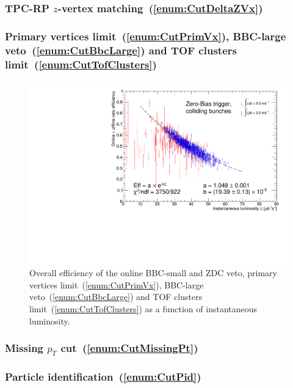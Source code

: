 \subsubsection{TPC-RP \texorpdfstring{$z$}{z}-vertex matching~(\ref{enum:CutDeltaZVx})}
\subsubsection{Primary vertices limit~(\ref{enum:CutPrimVx}), BBC-large veto~(\ref{enum:CutBbcLarge}) and TOF clusters limit~(\ref{enum:CutTofClusters})}
\begin{figure}[ht!]
\centering%
\includegraphics[width=0.65\linewidth,page=1]{graphics/corrections/OnlineAndOfflineVetoEffVsInstLumi_graph.pdf}%
\caption{Overall efficiency of the online BBC-small and ZDC veto, primary vertices limit~(\ref{enum:CutPrimVx}), BBC-large veto~(\ref{enum:CutBbcLarge}) and TOF clusters limit~(\ref{enum:CutTofClusters}) as a function of instantaneous luminosity.}\label{fig:onlineAndOfflineVetoEff}%
\end{figure}
\subsubsection{Missing \texorpdfstring{$p_{T}$}{pT} cut~(\ref{enum:CutMissingPt})}
\subsubsection{Particle identification~(\ref{enum:CutPid})}


